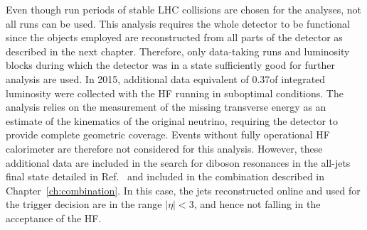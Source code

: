 Even though run periods of stable LHC collisions are chosen for the analyses, not all runs can be used.
This analysis requires the whole detector to be functional since the objects employed are reconstructed from all parts of the detector as described in the next chapter.
Therefore, only data-taking runs and luminosity blocks during which the detector was in a state sufficiently good for further analysis are used.
In 2015, additional data equivalent of 0.37\fbinv of integrated luminosity were collected with the HF running in suboptimal conditions.
The analysis relies on the measurement of the missing transverse energy as an estimate of the kinematics of the original neutrino,
requiring the detector to provide complete geometric coverage. Events without fully operational HF calorimeter are therefore not considered for this analysis.
However, these additional data are included in the search for diboson resonances in the all-jets final state detailed in Ref.~\cite{CMS-PAS-EXO-15-002} and included in the combination described in Chapter~\ref{ch:combination}.
In this case, the jets reconstructed online and used for the trigger decision are in the range $|\eta| < 3$, and hence not falling in the acceptance of the HF.

